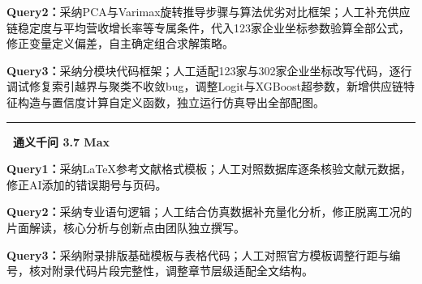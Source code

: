 \documentclass[12pt,a4paper]{ctexart}
\begin{document}
\textbf{Query2：}采纳PCA与Varimax旋转推导步骤与算法优劣对比框架；人工补充供应链稳定度与平均营收增长率等专属条件，代入123家企业坐标参数验算全部公式，修正变量定义偏差，自主确定组合求解策略。

\textbf{Query3：}采纳分模块代码框架；人工适配123家与302家企业坐标改写代码，逐行调试修复索引越界与聚类不收敛bug，调整Logit与XGBoost超参数，新增供应链特征构造与置信度计算自定义函数，独立运行仿真导出全部配图。

\noindent\rule{\linewidth}{0.4pt}

\noindent\textbf{\textbullet~通义千问 3.7 Max}

\textbf{Query1：}采纳LaTeX参考文献格式模板；人工对照数据库逐条核验文献元数据，修正AI添加的错误期号与页码。

\textbf{Query2：}采纳专业语句逻辑；人工结合仿真数据补充量化分析，修正脱离工况的片面解读，核心分析与创新点由团队独立撰写。

\textbf{Query3：}采纳附录排版基础模板与表格代码；人工对照官方模板调整行距与编号，核对附录代码片段完整性，调整章节层级适配全文结构。
\end{document}
